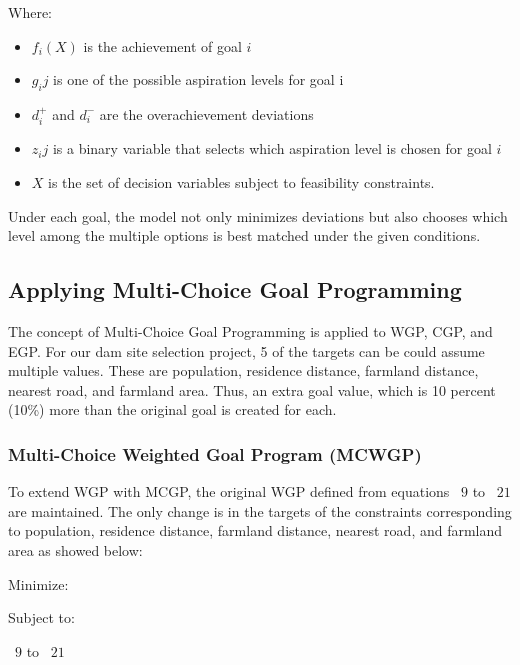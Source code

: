 Where:
\begin{itemize}
  \item $f_i(X)$ is the achievement of goal $i$
  \item $g_ij$ is one of the possible aspiration levels for goal i
  \item $d_i^+$ and $d_i^-$ are the overachievement deviations
  \item $z_ij$ is a binary variable that selects which aspiration level is chosen for goal $i$
  \item $X$ is the set of decision variables subject to feasibility constraints.
\end{itemize}
Under each goal, the model not only minimizes deviations but also chooses which level among the multiple options is best matched under the given conditions.

\subsection{Applying Multi-Choice Goal Programming}

The concept of Multi-Choice Goal Programming is applied to \gls{WGP}, \gls{CGP}, and \gls{EGP}.
For our dam site selection project, 5 of the targets can be could assume multiple values. These are population, residence distance, farmland distance, nearest road, and farmland area. Thus, an extra goal value, which is 10 percent (10\%) more than the original goal is created for each.

\subsubsection{Multi-Choice Weighted Goal Program (MCWGP)}
To extend \gls{WGP} with \gls{MCGP}, the original WGP defined from equations ~$9$ to ~$21$ are maintained. The only change is in the targets of the constraints corresponding to population, residence distance, farmland distance, nearest road, and farmland area as showed below:

Minimize:
\EqDamWGPObjectiveEleven

Subject to:
        \EqMCWGPPopulationConstraintFourtyTwo   
        \EqMCWGPResidenceConstraintFourtyThree
        \EqMCWGPFarmlandDistanceConstraintFourtyFour
        \EqMCWGPNearestRoadConstraintFourtyFive
        \EqMCWGPFarmlandAreaConstraintFourtySix
        \begin{center}
               ~$9$ to ~$21$ 
        \end{center}


